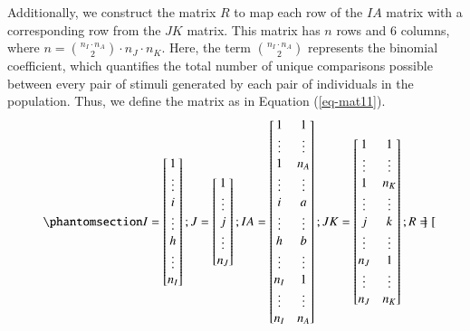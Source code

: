 \documentclass[
  authoryear,
  review,
  1p]{elsarticle}
\begin{document}
Additionally, we construct the matrix \(R\) to map each row of the
\(IA\) matrix with a corresponding row from the \(JK\) matrix. This
matrix has \(n\) rows and \(6\) columns, where
\(n = {n_{I} \cdot n_{A} \choose 2} \cdot n_{J} \cdot n_{K}\). Here, the
term \({n_{I} \cdot n_{A} \choose 2}\) represents the binomial
coefficient, which quantifies the total number of unique comparisons
possible between every pair of stimuli generated by each pair of
individuals in the population. Thus, we define the matrix as in Equation
(\ref{eq-mat11}). \begin{equation}\phantomsection\label{eq-mat11}{
I = \begin{bmatrix}
1 \\
\vdots \\
i \\
\vdots \\
h \\
\vdots \\
n_{I}
\end{bmatrix};
J = \begin{bmatrix}
1 \\
\vdots \\
j \\
\vdots \\
n_{J}
\end{bmatrix};
IA = \begin{bmatrix}
1 & 1 \\
\vdots & \vdots \\
1 & n_{A} \\
\vdots & \vdots \\
i & a \\
\vdots & \vdots \\
h & b \\
\vdots & \vdots \\
n_{I} & 1 \\
\vdots & \vdots \\
n_{I} & n_{A}
\end{bmatrix};
JK = \begin{bmatrix}
1 & 1 \\
\vdots & \vdots \\
1 & n_{K} \\
\vdots & \vdots \\
j & k \\
\vdots & \vdots \\
n_{J} & 1 \\
\vdots & \vdots \\
n_{J} & n_{K}
\end{bmatrix};
R = \begin{bmatrix}

\end{bmatrix}}
\end{equation}
\end{document}
